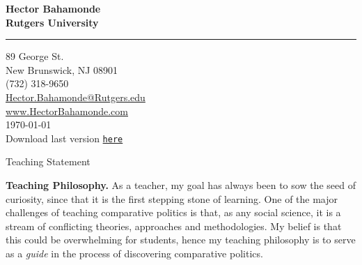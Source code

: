 \documentclass[11pt]{letter} %
\date{}
\begin{document}

\begin{letter}{} 


\begin{center}
\large\bf Hector Bahamonde \\ %
Rutgers University\\
\vspace{20pt} \hrule height 1pt %
89 George St. \\ New Brunswick, NJ 08901 \\ (732) 318-9650 \\ 
{\normalfont\normalsize\href{mailto:hector.bahamonde@rutgers.edu}{Hector.Bahamonde@Rutgers.edu}} \\
{\normalfont\normalsize\href{http://www.hectorbahamonde.com}{www.HectorBahamonde.com}}\\
{\normalfont \scriptsize{
\vspace{5mm}\today\\
Download last version \href{http://github.com/hbahamonde/Job_Market/raw/master/Bahamonde_Teaching_Statement_LAC.pdf}{\texttt{{\color{red}here}}}}} %


{\huge\vspace{8mm} Teaching Statement}
\end{center} 

\signature{} %

\opening{} 
 
{\bf Teaching Philosophy.} As a teacher, my goal has always been to sow the seed of curiosity, since that it is the first stepping stone of learning. One of the major challenges of teaching comparative politics is that, as any social science, it is a stream of conflicting theories, approaches and methodologies. My belief is that this could be overwhelming for students, hence my teaching philosophy is to serve as a \emph{guide} in the process of discovering comparative politics.


\end{letter}
\end{document}
